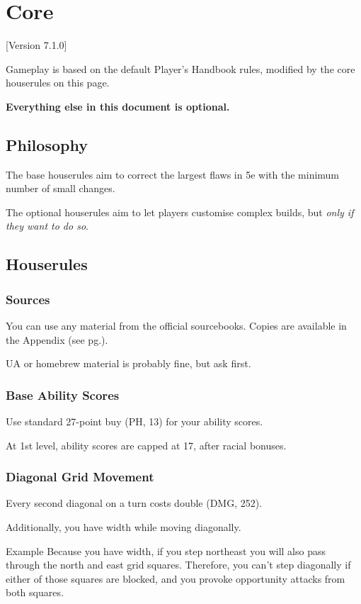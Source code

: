 \documentclass[letterpaper,twocolumn,openany,nodeprecatedcode]{dndbook}
\newcommand{\pg}[1]{pg.\pageref{#1}}
\newcommand{\see}[1]{(see \pg{#1})}
\begin{document}
\tableofcontents




\chapter{Core}

[Version 7.1.0]

Gameplay is based on the default Player's Handbook rules, modified by the core houserules on this page. 

\textbf{Everything else in this document is optional.}

\section{Philosophy}
The base houserules aim to correct the largest flaws in 5e with the minimum number of small changes.

The optional houserules aim to let players customise complex builds, but \textit{only if they want to do so}.


\newpage

\section{Houserules}
\subsection{Sources}
You can use any material from the official sourcebooks. Copies are available in the Appendix \see{sources}. 

UA or homebrew material is probably fine, but ask first.

\subsection{Base Ability Scores}
Use standard 27-point buy (PH, 13) for your ability scores. 

At 1st level, ability scores are capped at 17, after racial bonuses.

\subsection{Diagonal Grid Movement}
Every second diagonal on a turn costs double (DMG, 252).

Additionally, you have width while moving diagonally. 

\begin{DndComment}{Example}
Because you have width, if you step northeast you will also pass through the north and east grid squares. Therefore, you can't step diagonally if either of those squares are blocked, and you provoke opportunity attacks from both squares.
\end{DndComment}
\end{document}
